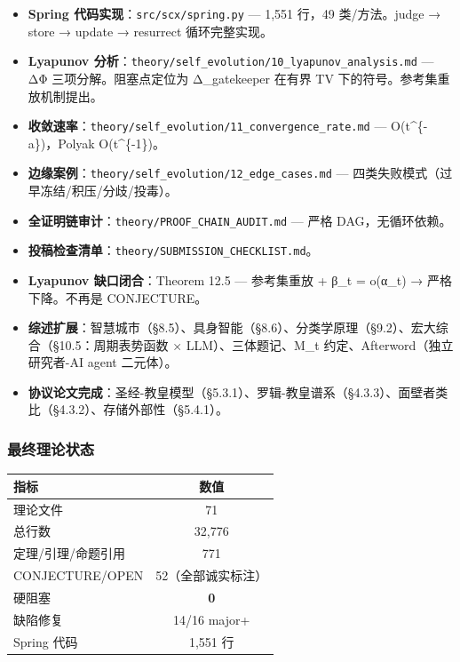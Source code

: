 \documentclass[
  12pt,
]{ctexart}
\providecommand{\tightlist}{%
  \setlength{\itemsep}{0pt}\setlength{\parskip}{0pt}}
\begin{document}
\begin{itemize}
\tightlist
\item
  \textbf{Spring 代码实现}：\texttt{src/scx/spring.py} --- 1,551 行，49
  类/方法。judge → store → update → resurrect 循环完整实现。
\item
  \textbf{Lyapunov
  分析}：\texttt{theory/self\_evolution/10\_lyapunov\_analysis.md} ---
  ΔΦ 三项分解。阻塞点定位为 Δ\_gatekeeper 在有界 TV
  下的符号。参考集重放机制提出。
\item
  \textbf{收敛速率}：\texttt{theory/self\_evolution/11\_convergence\_rate.md}
  --- O(t\^{}\{-a\})，Polyak O(t\^{}\{-1\})。
\item
  \textbf{边缘案例}：\texttt{theory/self\_evolution/12\_edge\_cases.md}
  --- 四类失败模式（过早冻结/积压/分歧/投毒）。
\item
  \textbf{全证明链审计}：\texttt{theory/PROOF\_CHAIN\_AUDIT.md} --- 严格
  DAG，无循环依赖。
\item
  \textbf{投稿检查清单}：\texttt{theory/SUBMISSION\_CHECKLIST.md}。
\item
  \textbf{Lyapunov 缺口闭合}：Theorem 12.5 --- 参考集重放 + β\_t =
  o(α\_t) → 严格下降。不再是 CONJECTURE。
\item
  \textbf{综述扩展}：智慧城市（§8.5）、具身智能（§8.6）、分类学原理（§9.2）、宏大综合（§10.5：周期表势函数
  × LLM）、三体题记、M\_t 约定、Afterword（独立研究者-AI agent
  二元体）。
\item
  \textbf{协议论文完成}：圣经-教皇模型（§5.3.1）、罗辑-教皇谱系（§4.3.3）、面壁者类比（§4.3.2）、存储外部性（§5.4.1）。
\end{itemize}

\subsubsection{最终理论状态}\label{ux6700ux7ec8ux7406ux8bbaux72b6ux6001}

\begin{longtable}[]{@{}lc@{}}
\toprule\noalign{}
指标 & 数值 \\
\midrule\noalign{}
\endhead
\bottomrule\noalign{}
\endlastfoot
理论文件 & 71 \\
总行数 & 32,776 \\
定理/引理/命题引用 & 771 \\
CONJECTURE/OPEN & 52（全部诚实标注） \\
硬阻塞 & \textbf{0} \\
缺陷修复 & 14/16 major+ \\
Spring 代码 & 1,551 行 \\
\end{longtable}
\end{document}
